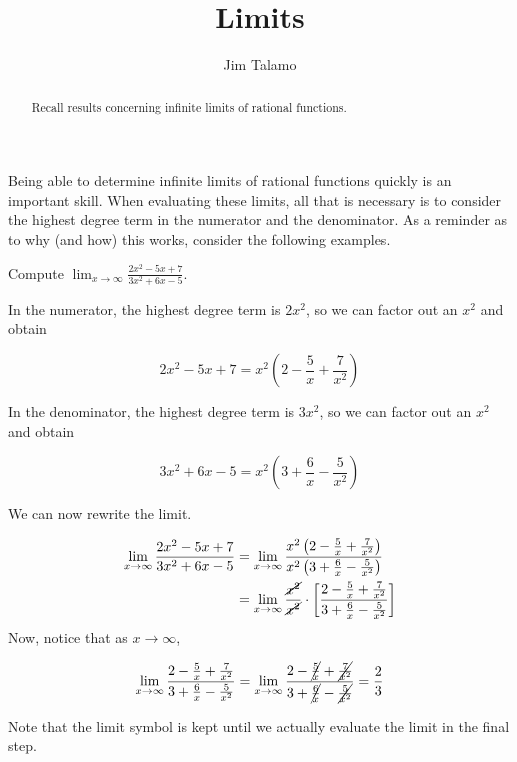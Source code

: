 \documentclass{ximera}
\author{Jim Talamo}
\title[Refresh:]{Limits}
\begin{document}
\begin{abstract}
Recall results concerning infinite limits of rational functions.
\end{abstract}
\maketitle


Being able to determine infinite limits of rational functions quickly is an important skill.  When evaluating these limits, all that is necessary is to consider the highest degree term in the numerator and the denominator.  As a reminder as to why (and how) this works, consider the following examples.

\begin{example}
Compute $\lim_{x \to \infty} \frac{2x^2-5x+7}{3x^2+6x-5}$.

\begin{explanation}
In the numerator, the highest degree term is $2x^2$, so we can factor out an $x^2$ and obtain

\[
2x^2-5x+7 = x^2\left(2-\frac{5}{x} + \frac{7}{x^2}\right)
\]

In the denominator, the highest degree term is $3x^2$, so we can factor out an $x^2$ and obtain

\[
3x^2+6x-5 = x^2\left(3+\frac{6}{x} - \frac{5}{x^2}\right)
\]

We can now rewrite the limit.

\begin{align*}
\lim_{x \to \infty} \frac{2x^2-5x+7}{3x^2+6x-5} &= \lim_{x \to \infty} \frac{x^2\left(2-\frac{5}{x} + \frac{7}{x^2}\right)}{x^2\left(3+\frac{6}{x} - \frac{5}{x^2}\right)} \\
&= \lim_{x \to \infty} \frac{\cancel{x^2}}{\cancel{x^2}} \cdot \left[ \frac{2-\frac{5}{x} + \frac{7}{x^2}}{3+\frac{6}{x} - \frac{5}{x^2}} \right] \\
\end{align*}
Now, notice that as $x \to \infty$, 

\[
 \lim_{x \to \infty}   \frac{2-\frac{5}{x} + \frac{7}{x^2}}{3+\frac{6}{x} - \frac{5}{x^2}} = \lim_{x \to \infty}   \frac{2-\cancel{\frac{5}{x}} + \cancel{\frac{7}{x^2}}}{3+\cancel{\frac{6}{x}} - \cancel{\frac{5}{x^2}}} = \frac{2}{3}\\
\]

Note that the limit symbol is kept until we actually evaluate the limit in the final step.  
\end{explanation}
\end{example}
\end{document}
